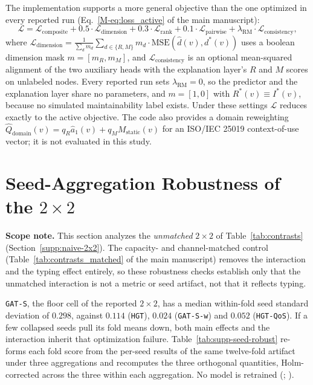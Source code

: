 \documentclass[preprint,3p]{elsarticle}
\begin{document}
The implementation supports a more general objective than the one optimized in every reported run (Eq.~\ref{M-eq:loss_active} of the main manuscript):
\begin{equation}
\mathcal{L} = \mathcal{L}_{\text{composite}} + 0.5 \cdot \mathcal{L}_{\text{dimension}} + 0.3 \cdot \mathcal{L}_{\text{rank}} + 0.1 \cdot \mathcal{L}_{\text{pairwise}} + \lambda_{\text{RM}} \cdot \mathcal{L}_{\text{consistency}},
\end{equation}
where $\mathcal{L}_{\text{dimension}} = \frac{1}{\sum_{d} m_d} \sum_{d \in \{R, M\}} m_d \cdot \text{MSE}(\hat{d}(v), d^*(v))$ uses a boolean dimension mask $m = [m_R, m_M]$, and $\mathcal{L}_{\text{consistency}}$ is an optional mean-squared alignment of the two auxiliary heads with the explanation layer's $R$ and $M$ scores on unlabeled nodes. Every reported run sets $\lambda_{\text{RM}} = 0$, so the predictor and the explanation layer share no parameters, and $m = [1, 0]$ with $R^*(v) \equiv I^*(v)$, because no simulated maintainability label exists. Under these settings $\mathcal{L}$ reduces exactly to the active objective. The code also provides a domain reweighting $\hat{Q}_{\text{domain}}(v) = q_R \hat{a}_1(v) + q_M M_{\text{static}}(v)$ for an ISO/IEC 25019 context-of-use vector; it is not evaluated in this study.

\section{Seed-Aggregation Robustness of the \texorpdfstring{$2\times2$}{2x2}}
\label{supp:seed-robust}

\noindent\textbf{Scope note.} This section analyzes the \emph{unmatched} $2\times2$ of Table~\ref{tab:contrasts} (Section~\ref{supp:naive-2x2}). The capacity- and channel-matched control (Table~\ref{tab:contrasts_matched} of the main manuscript) removes the interaction and the typing effect entirely, so these robustness checks establish only that the unmatched interaction is not a metric or seed artifact, not that it reflects typing.

\texttt{GAT-S}, the floor cell of the reported $2\times2$, has a median within-fold seed standard deviation of $0.298$, against $0.114$ (\texttt{HGT}), $0.024$ (\texttt{GAT-S-w}) and $0.052$ (\texttt{HGT-QoS}). If a few collapsed seeds pull its fold means down, both main effects and the interaction inherit that optimization failure. Table~\ref{tab:supp-seed-robust} re-forms each fold score from the per-seed results of the same twelve-fold artifact under three aggregations and recomputes the three orthogonal quantities, Holm-corrected across the three within each aggregation. No model is retrained (; ).
\end{document}
